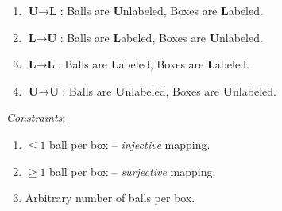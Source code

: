 \documentclass[a4paper,12pt]{article}
\begin{document}
\begin{tasks}[align=right,left=0pt]
    \begin{enumerate}[label=\alph*., itemsep=4pt]
        \item $\textbf{U} \to \textbf{L}$: Balls are \textbf{U}nlabeled, Boxes are \textbf{L}abeled.

        \resetBalls
        \resetBoxes
        \renewcommand{\theballs}{}
        \renewcommand{\theboxes}{\Alph{boxes}}
        \drawBoxWithThreeBalls
        \drawBoxWithoutBalls
        \drawBoxWithFourBalls
        \drawBoxWithTwoBalls
        \drawBoxWithOneBall

        \item $\textbf{L} \to \textbf{U}$: Balls are \textbf{L}abeled, Boxes are \textbf{U}nlabeled.

        \resetBoxes
        \resetBalls
        \renewcommand{\theballs}{\arabic{balls}}
        \renewcommand{\theboxes}{}
        \drawBoxWithOneBall
        \drawBoxWithTwoBalls
        \drawBoxWithoutBalls
        \drawBoxWithFourBalls
        \drawBoxWithThreeBalls

        \item $\textbf{L} \to \textbf{L}$: Balls are \textbf{L}abeled, Boxes are \textbf{L}abeled.

        \resetBoxes
        \resetBalls
        \renewcommand{\theballs}{\arabic{balls}}
        \renewcommand{\theboxes}{\Alph{boxes}}
        \drawBoxWithTwoBalls
        \drawBoxWithOneBall
        \drawBoxWithThreeBalls
        \drawBoxWithoutBalls
        \drawBoxWithFourBalls

        \item $\textbf{U} \to \textbf{U}$: Balls are \textbf{U}nlabeled, Boxes are \textbf{U}nlabeled.

        \resetBoxes
        \resetBalls
        \renewcommand{\theballs}{}
        \renewcommand{\theboxes}{}
        \drawBoxWithFourBalls
        \drawBoxWithThreeBalls
        \drawBoxWithTwoBalls
        \drawBoxWithOneBall
        \drawBoxWithoutBalls
    \end{enumerate}

    \smallskip
    \textit{\uline{Constraints}}:

    \begin{enumerate}[label=\arabic*., noitemsep]
        \item $\leq 1$ ball per box \--- \emph{injective} mapping.
        \item $\geq 1$ ball per box \--- \emph{surjective} mapping.
        \item Arbitrary number of balls per box.
    \end{enumerate}


\end{tasks}
\end{document}

